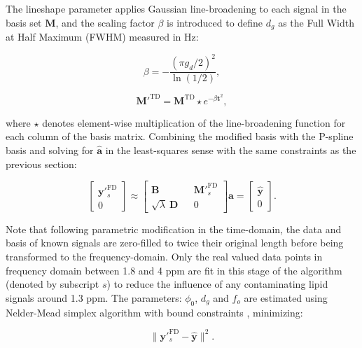 \documentclass[num-refs]{wiley-article}
\begin{document}
The lineshape parameter applies Gaussian line-broadening to each signal in the basis set $\mathbf{M}$, and the scaling factor $\beta$ is introduced to define $d_{g}$ as the Full Width at Half Maximum (FWHM) measured in Hz:

\begin{equation}
  \beta = -\frac{{(\pi g_{d} / 2)}^{2}}{\ln(1/2)},
\end{equation}

\begin{equation}
  \mathbf{M}'^{\mathrm{TD}} = \mathbf{M}^{\mathrm{TD}} \star e^{-\beta \mathbf{t}^{2}},
\end{equation}

where $\star$ denotes element-wise multiplication of the line-broadening function for each column of the basis matrix. Combining the modified basis with the P-spline basis and solving for $\hat{\mathbf{a}}$ in the least-squares sense with the same constraints as the previous section:

\begin{equation}
  \begin{bmatrix}
    \textbf{y}'^{\mathrm{FD}}_{s} \\ 0
  \end{bmatrix}
  \approx
  \begin{bmatrix}
    \textbf{B} && \textbf{M}'^{\mathrm{FD}}_{s} \\ \sqrt{\lambda} \ \textbf{D} && 0
  \end{bmatrix} \hat{\mathbf{a}} =
  \begin{bmatrix}
    \hat{\textbf{y}} \\ 0
  \end{bmatrix}.
  \label{linear_fit}
\end{equation}

Note that following parametric modification in the time-domain, the data and basis of known signals are zero-filled to twice their original length before being transformed to the frequency-domain. Only the real valued data points in frequency domain between 1.8 and 4 ppm are fit in this stage of the algorithm (denoted by subscript $s$) to reduce the influence of any contaminating lipid signals around 1.3 ppm. The parameters: $\phi_{0}$, $d_{g}$ and $f_{o}$ are estimated using Nelder-Mead simplex algorithm with bound constraints \cite{Box1965}, minimizing:

\begin{equation}
  \| \textbf{y}'^{\mathrm{FD}}_{s}  - \hat{\textbf{y}} \|^{2}.
  \label{obj_fn}
\end{equation}
\end{document}
